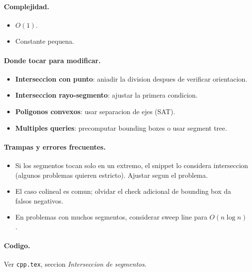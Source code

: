 \paragraph{Complejidad.}
\begin{itemize}\setlength\itemsep{0pt}
	\item $O(1)$.
	\item Constante pequena.
\end{itemize}

\paragraph{Donde tocar para modificar.}
\begin{itemize}\setlength\itemsep{0pt}
	\item \textbf{Interseccion con punto}: aniadir la division despues de verificar orientacion.
	\item \textbf{Interseccion rayo-segmento}: ajustar la primera condicion.
	\item \textbf{Poligonos convexos}: usar separacion de ejes (SAT).
	\item \textbf{Multiples queries}: precomputar bounding boxes o usar segment tree.
\end{itemize}

\paragraph{Trampas y errores frecuentes.}
\begin{itemize}\setlength\itemsep{0pt}
	\item Si los segmentos tocan solo en un extremo, el snippet lo considera interseccion (algunos problemas quieren estricto). Ajustar segun el problema.
	\item El caso colineal es comun; olvidar el check adicional de bounding box da falsos negativos.
	\item En problemas con muchos segmentos, considerar sweep line para $O(n \log n)$.
\end{itemize}

\paragraph{Codigo.}
Ver \texttt{cpp.tex}, seccion \textit{Interseccion de segmentos}.

\vspace{0.5em}
